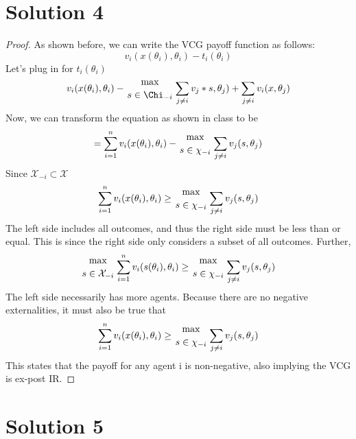 \documentclass[10pt,a4paper]{article}
\begin{document}
\section*{Solution 4}
  \begin{proof}
    As shown before, we can write the VCG payoff function as follows:
    \begin{equation}
      v_i(x(\theta_i),\theta_i) - t_i(\theta_i) 
    \end{equation}
    Let's plug in for $t_i(\theta_i)$
    \begin{equation}
      v_i(x(\theta_i),\theta_i) - {\max\atop{s\in\Chi_{-i}}}\sum\limits_{j\ne i}v_j*s, \theta_j) + \sum\limits_{j\ne i}v_i(x,\theta_j)
    \end{equation}
    Now, we can transform the equation as shown in class to be 
    \begin{equation}
      =\sum\limits_{i=1}^nv_i(x(\theta_i),\theta_i) - {\max\atop{s\in\chi_{-i}}}\sum\limits_{j\ne i}v_j(s, \theta_j)
    \end{equation}
    Since $\mathcal{X}_{-i}\subset\mathcal{X}$
    \begin{equation}
      \sum\limits_{i=1}^nv_i(x(\theta_i),\theta_i) \geq {\max\atop{s\in\chi_{-i}}}\sum\limits_{j\ne i}v_j(s, \theta_j)
    \end{equation}
    The left side includes all outcomes, and thus the right side must be less than or equal. This is since the right side only considers a subset of all outcomes. Further, 
    \begin{equation}
      {\max\atop{s\in\mathcal{X}_{-i}}}\sum\limits_{i=1}^nv_i(s(\theta_i),\theta_i) \geq {\max\atop{s\in\chi_{-i}}}\sum\limits_{j\ne i}v_j(s, \theta_j)
    \end{equation}
    The left side necessarily has more agents. Because there are no negative externalities, it must also be true that 
    \begin{equation}
      \sum\limits_{i=1}^nv_i(x(\theta_i),\theta_i)\geq {\max\atop{s\in\chi_{-i}}}\sum\limits_{j\ne i}v_j(s, \theta_j)
    \end{equation}
    This states that the payoff for any agent i is non-negative, also implying the VCG is ex-post IR.
  \end{proof}

\section*{Solution 5}
\end{document}
